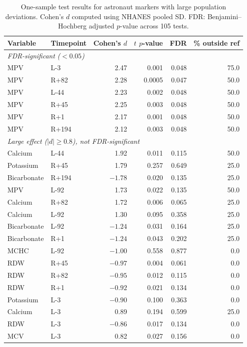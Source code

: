\documentclass[11pt,a4paper]{article}
\begin{document}
\begin{table}[H]
\centering
\caption{One-sample test results for astronaut markers with large population deviations. Cohen's $d$ computed using NHANES pooled SD. FDR: Benjamini--Hochberg adjusted $p$-value across 105 tests.}
\label{tab:onesample}
\begin{tabular}{llrrrr}
\toprule
\textbf{Variable} & \textbf{Timepoint} & \textbf{Cohen's $d$} & \textbf{$t$ $p$-value} & \textbf{FDR} & \textbf{\% outside ref} \\
\midrule
\multicolumn{6}{l}{\textit{FDR-significant ($< 0.05$)}} \\
MPV & L-3 & 2.47 & 0.001 & 0.048 & 75.0 \\
MPV & R+82 & 2.28 & 0.0005 & 0.047 & 50.0 \\
MPV & L-44 & 2.23 & 0.002 & 0.048 & 50.0 \\
MPV & R+45 & 2.25 & 0.003 & 0.048 & 50.0 \\
MPV & R+1 & 2.17 & 0.001 & 0.048 & 50.0 \\
MPV & R+194 & 2.12 & 0.003 & 0.048 & 50.0 \\
\midrule
\multicolumn{6}{l}{\textit{Large effect ($|d| \geq 0.8$), not FDR-significant}} \\
Calcium & L-44 & 1.92 & 0.011 & 0.115 & 50.0 \\
Potassium & R+45 & 1.79 & 0.257 & 0.649 & 25.0 \\
Bicarbonate & R+194 & $-1.78$ & 0.020 & 0.135 & 25.0 \\
MPV & L-92 & 1.73 & 0.022 & 0.135 & 50.0 \\
Calcium & R+82 & 1.72 & 0.006 & 0.065 & 25.0 \\
Calcium & L-92 & 1.30 & 0.095 & 0.358 & 25.0 \\
Bicarbonate & L-92 & $-1.24$ & 0.031 & 0.164 & 25.0 \\
Bicarbonate & R+1 & $-1.24$ & 0.043 & 0.202 & 25.0 \\
MCHC & L-92 & $-1.00$ & 0.558 & 0.877 & 0.0 \\
RDW & R+45 & $-0.97$ & 0.004 & 0.061 & 0.0 \\
RDW & R+82 & $-0.95$ & 0.012 & 0.115 & 0.0 \\
RDW & R+1 & $-0.92$ & 0.021 & 0.134 & 0.0 \\
Potassium & L-3 & $-0.90$ & 0.100 & 0.363 & 0.0 \\
Calcium & L-3 & 0.89 & 0.194 & 0.599 & 25.0 \\
RDW & L-3 & $-0.86$ & 0.017 & 0.134 & 0.0 \\
MCV & L-3 & 0.82 & 0.027 & 0.156 & 0.0 \\
\bottomrule
\end{tabular}
\end{table}
\end{document}
